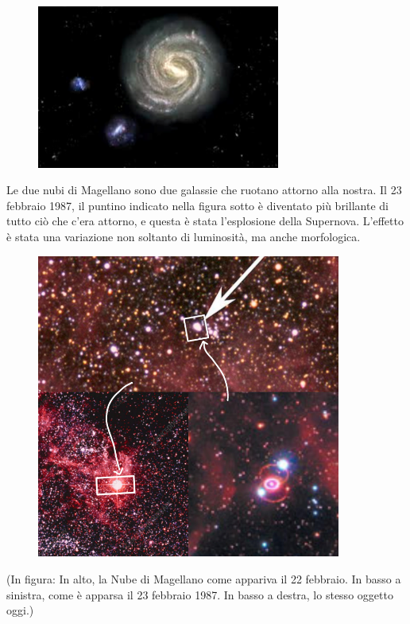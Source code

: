 \begin{figure}[H]
    \centering
    \includegraphics[width=8cm]{lezione 28 novembre/nubidimagellano.png}
    \label{lezione 28 novembre/nubidimagellano.png}
\end{figure}

Le due nubi di Magellano sono due galassie che ruotano attorno alla nostra. Il 23 febbraio 1987, il puntino indicato nella figura sotto è diventato più brillante di tutto ciò che c'era attorno, e questa è stata l'esplosione della Supernova. L'effetto è stata una variazione non soltanto di luminosità, ma anche morfologica.

\begin{figure}[H]
    \centering
    \includegraphics[width=10cm]{lezione 28 novembre/sn1897a.png}
    \label{lezione 28 novembre/sn1897a.png}
\end{figure}

(In figura: In alto, la Nube di Magellano come appariva il 22 febbraio. In basso a sinistra, come è apparsa il 23 febbraio 1987. In basso a destra, lo stesso oggetto oggi.)

